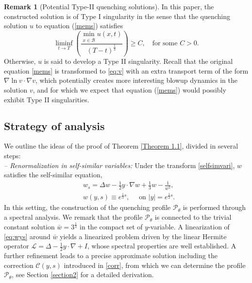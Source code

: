 \documentclass[11pt,reqno]{amsart}
\theoremstyle{definition}
\theoremstyle{bfremark}
\newtheorem{remark}{Remark}[section]
\numberwithin{equation}{section}
\begin{document}
\begin{remark}[Potential Type-II quenching solutions] In this paper, the constructed solution is of Type I singularity in the sense that the quenching solution \(u\) to equation (\ref{mems}) satisfies 
\[
    \liminf_{t \to T} \left( \frac{\min_{x \in \overline{\mathcal{B}}} u(x,t)}{(T-t)^{\frac{1}{3}}} \right) \geq C, \quad \text{for some } C > 0.
\]
Otherwise, \(u\) is said to develop a Type II singularity. Recall that the original equation \eqref{mems} is transformed to \eqref{eq:v} with an extra transport term of the form $\nabla \ln v \cdot \nabla v$, which potentially creates more interesting blowup dynamics in the solution $v$, and for which we expect that equation (\ref{mems}) would possibly exhibit Type II singularities.  
\end{remark}

\subsection{Strategy of analysis}
\label{Strategy of Analysis}
We outline the ideas of the proof of Theorem \ref{Theorem 1.1}, divided in several steps:\\
\textit{– Renormalization in self-similar variables:} Under the transform \ref{selfsimvari},
\(w\) satisfies the self-similar equation,
\begin{align}
    &w_s = \Delta w - \frac{1}{2} y \cdot \nabla w + \frac{1}{3}w - \frac{1}{w^2},\label{eq:wys}\\
    &w(y,s)\equiv e^{\frac{1}{3}s}, \quad \text{ on } |y|=e^{\frac{1}{2}s}. \label{eq:wysboundary}
\end{align}
In this setting, the construction of the quenching profile \(\mathcal{P}_{\theta}\) is performed through a spectral analysis. We remark that the profile $\mathcal{P}_{\theta}$ is connected to the trivial constant solution $\bar w = 3^{\frac{1}{3}}$ in the compact set of $y$-variable. A linearization of \eqref{eq:wys} around $\bar w$ yields a linearized problem driven by the linear Hermite operator $\mathcal{L} =\Delta - \frac{1}2y \cdot \nabla + I$, whose spectral properties are well established. A further refinement leads to a precise approximate solution including the correction $\mathcal{C}(y,s)$ introduced in \eqref{corr}, from which we can determine the profile $\mathcal{P}_{\theta}$, see Section \ref{section2} for a detailed derivation. 
\end{document}
